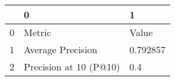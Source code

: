 \begin{tabular}{lll}
\toprule
{} &                       0 &         1 \\
\midrule
0 &                  Metric &     Value \\
1 &       Average Precision &  0.792857 \\
2 &  Precision at 10 (P@10) &       0.4 \\
\bottomrule
\end{tabular}
